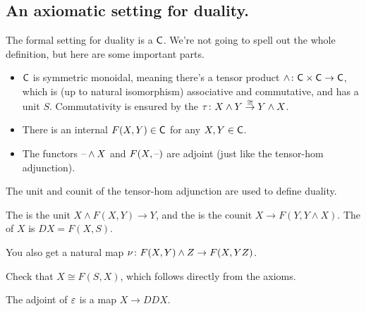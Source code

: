 \subsection*{An axiomatic setting for duality.}
The formal setting for duality is a  $\mathsf C$. We're not going to spell out
the whole definition, but here are some important parts.
\begin{itemize}
	\item $\mathsf C$ is symmetric monoidal, meaning there's a tensor product $\wedge\colon\mathsf C\times\mathsf C\to\mathsf C$, which is
	(up to natural isomorphism) associative and commutative, and has a unit $S$. Commutativity is ensured by the
	 $\tau\colon X\wedge Y\stackrel\cong\to Y\wedge X$.
	\item There is an internal  $F(X,Y)\in\mathsf C$ for any $X,Y\in\mathsf C$.
	\item The functors $\text{--}\wedge X$ and $F(X,\text{--})$ are adjoint (just like the tensor-hom adjunction).
\end{itemize}
The unit and counit of the tensor-hom adjunction are used to define duality.
\begin{defn}
The  is the unit $X\wedge F(X,Y)\to Y$, and the  is the counit $X\to
F(Y,Y\wedge X)$. The  of $X$ is $DX = F(X,S)$.
\end{defn} %
You also get a natural map $\nu\colon F(X,Y)\wedge Z\to F(X,Y\smash Z)$.
\begin{ex}
Check that $X\cong F(S,X)$, which follows directly from the axioms.
\end{ex}
The adjoint of $\varepsilon$ is a map $X\to DDX$.

